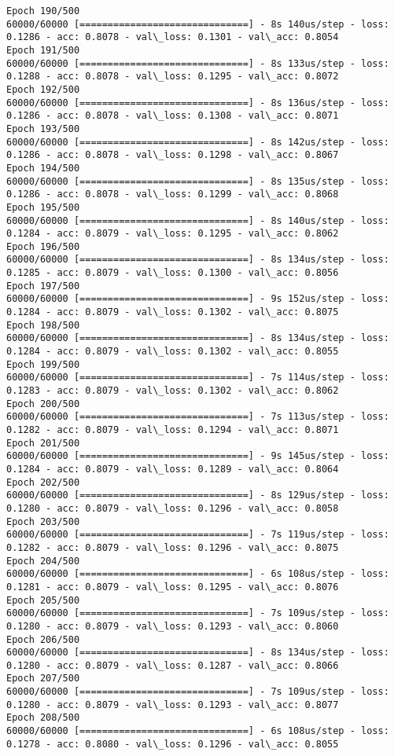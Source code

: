 \documentclass[11pt]{article}
\begin{document}
\begin{Verbatim}[commandchars=\\\{\}]
Epoch 190/500
60000/60000 [==============================] - 8s 140us/step - loss: 0.1286 - acc: 0.8078 - val\_loss: 0.1301 - val\_acc: 0.8054
Epoch 191/500
60000/60000 [==============================] - 8s 133us/step - loss: 0.1288 - acc: 0.8078 - val\_loss: 0.1295 - val\_acc: 0.8072
Epoch 192/500
60000/60000 [==============================] - 8s 136us/step - loss: 0.1286 - acc: 0.8078 - val\_loss: 0.1308 - val\_acc: 0.8071
Epoch 193/500
60000/60000 [==============================] - 8s 142us/step - loss: 0.1286 - acc: 0.8078 - val\_loss: 0.1298 - val\_acc: 0.8067
Epoch 194/500
60000/60000 [==============================] - 8s 135us/step - loss: 0.1286 - acc: 0.8078 - val\_loss: 0.1299 - val\_acc: 0.8068
Epoch 195/500
60000/60000 [==============================] - 8s 140us/step - loss: 0.1284 - acc: 0.8079 - val\_loss: 0.1295 - val\_acc: 0.8062
Epoch 196/500
60000/60000 [==============================] - 8s 134us/step - loss: 0.1285 - acc: 0.8079 - val\_loss: 0.1300 - val\_acc: 0.8056
Epoch 197/500
60000/60000 [==============================] - 9s 152us/step - loss: 0.1284 - acc: 0.8079 - val\_loss: 0.1302 - val\_acc: 0.8075
Epoch 198/500
60000/60000 [==============================] - 8s 134us/step - loss: 0.1284 - acc: 0.8079 - val\_loss: 0.1302 - val\_acc: 0.8055
Epoch 199/500
60000/60000 [==============================] - 7s 114us/step - loss: 0.1283 - acc: 0.8079 - val\_loss: 0.1302 - val\_acc: 0.8062
Epoch 200/500
60000/60000 [==============================] - 7s 113us/step - loss: 0.1282 - acc: 0.8079 - val\_loss: 0.1294 - val\_acc: 0.8071
Epoch 201/500
60000/60000 [==============================] - 9s 145us/step - loss: 0.1284 - acc: 0.8079 - val\_loss: 0.1289 - val\_acc: 0.8064
Epoch 202/500
60000/60000 [==============================] - 8s 129us/step - loss: 0.1280 - acc: 0.8079 - val\_loss: 0.1296 - val\_acc: 0.8058
Epoch 203/500
60000/60000 [==============================] - 7s 119us/step - loss: 0.1282 - acc: 0.8079 - val\_loss: 0.1296 - val\_acc: 0.8075
Epoch 204/500
60000/60000 [==============================] - 6s 108us/step - loss: 0.1281 - acc: 0.8079 - val\_loss: 0.1295 - val\_acc: 0.8076
Epoch 205/500
60000/60000 [==============================] - 7s 109us/step - loss: 0.1280 - acc: 0.8079 - val\_loss: 0.1293 - val\_acc: 0.8060
Epoch 206/500
60000/60000 [==============================] - 8s 134us/step - loss: 0.1280 - acc: 0.8079 - val\_loss: 0.1287 - val\_acc: 0.8066
Epoch 207/500
60000/60000 [==============================] - 7s 109us/step - loss: 0.1280 - acc: 0.8079 - val\_loss: 0.1293 - val\_acc: 0.8077
Epoch 208/500
60000/60000 [==============================] - 6s 108us/step - loss: 0.1278 - acc: 0.8080 - val\_loss: 0.1296 - val\_acc: 0.8055

\end{Verbatim}
\end{document}
